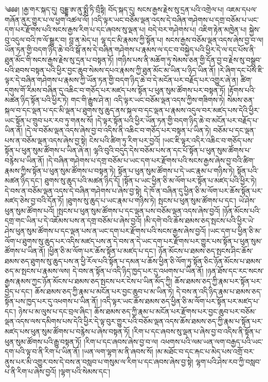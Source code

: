 \setcounter{footnote}{0} 
༄༅༅། །རྒྱ་གར་སྐད་དུ། བུདྡྷ་ཨ་ནུ་སྨྲྀ་ཏི་བྲྀཏྟི། བོད་སྐད་དུ། སངས་རྒྱས་རྗེས་སུ་དྲན་པའི་འགྲེལ་པ། འཇམ་དཔལ་གཞོན་ནུར་གྱུར་པ་ལ་ཕྱག་འཚལ་ལོ། །འདི་ལྟར་ཡང་བཅོམ་ལྡན་འདས་དེ་བཞིན་གཤེགས་པ་དགྲ་བཅོམ་པ་ཡང་དག་པར་རྫོགས་པའི་སངས་རྒྱས་རིག་པ་དང་ཞབས་སུ་ལྡན་པ། བདེ་བར་གཤེགས་པ། འཇིག་རྟེན་མཁྱེན་པ། སྐྱེས་བུ་འདུལ་བའི་ཁ་ལོ་སྒྱུར་བ། བླ་ན་མེད་པ། ལྷ་དང་མི་རྣམས་ཀྱི་སྟོན་པ། སངས་རྒྱས་བཅོམ་ལྡན་འདས་ཞེས་བྱ་བ་ལ། ཡོན་ཏན་གྱི་བདག་ཉིད་ཆེ་བའི་སྒོ་ནས་དེ་བཞིན་གཤེགས་པ་རྣམས་ལ་དང་བ་བསྐྱེད་པའི་ཕྱིར་དེ་ལ་དང་པོས་ནི་ཐུན་མོང་གི་སངས་རྒྱས་རྗེས་སུ་དྲན་པ་བསྟན་ཏོ། །གཉིས་པས་ནི་མཆོག་ཏུ་སེམས་ཅན་གྱི་དོན་བྱ་བ་རྗེས་སུ་བསྒྲུབ་པའི་ཐབས་བསྟན་པའི་ཕྱིར་བྱང་ཆུབ་སེམས་དཔའ་རྣམས་ཀྱི་ཐུན་མོང་མ་ཡིན་པ་ཉིད་ཡིན་ནོ། །རེ་ཞིག་དང་པོས་ཇི་ལྟར་དེ་བཞིན་གཤེགས་པ་རྣམས་ཀྱི་ཡོན་ཏན་གྱི་བདག་ཉིད་ཆེ་བ་དེ་མངོན་པར་བརྗོད་པར་འགྱུར་ཞེ་ན། ཚིག་དགུས་གོ་རིམས་བཞིན་དུ་འཆིང་བ་གཅོད་པར་མཛད་པས་སྟོན་པ་ཕུན་སུམ་ཚོགས་པར་བསྟན་ཏོ། །རྟོགས་པའི་མཚན་ཉིད་སྟོན་པའི་ཕྱིར་ཏེ། གང་གི་རྒྱུས་ཤེ་ན། འདི་ལྟར་ཡང་བཅོམ་ལྡན་འདས་ཀྱིས་གཟིགས་ཏེ། སེམས་ཅན་སྐལ་བ་དང་ལྡན་པ་དང་མི་ལྡན་པ་ཐུགས་སུ་ཆུད་ནས་སྐལ་བ་དང་ལྡན་པ་རྣམས་འདུལ་བར་མཛད་པས་དེའི་ཕྱིར་ཡང་སྟོན་པ་གྲུབ་པར་རབ་ཏུ་གནས་སོ། །དེ་ལྟར་སྟོན་པའི་ཕྱིར་ཡོན་ཏན་གྱི་བདག་ཉིད་ཆེ་བ་མངོན་པར་བརྗོད་པ་ཡིན་ནོ། །དེ་ལ་བཅོམ་ལྡན་འདས་ཞེས་བྱ་བ་འདིས་ནི་འཆིང་བ་གཅོད་པར་བསྟན་པ་ཡིན་ཏེ། བཅོམ་པ་དང་ལྡན་པས་ན་བཅོམ་ལྡན་འདས་ཞེས་བྱ་སྟེ། ངེས་པའི་ཚིག་ཏུ་རིག་པར་བྱའོ། །ཡང་ཇི་ལྟར་འདིར་འཆིང་བ་གཅོད་པས་སྟོན་པ་ཕུན་སུམ་ཚོགས་པ་ཡིན་ཞེ་ན། ལྷའི་བུའི་བདུད་དེས་བཅོམ་པས་ན་དང་པོ་སྟོན་པ་ཕུན་སུམ་ཚོགས་པ་བརྙེས་པ་ཡིན་ནོ། །དེ་བཞིན་གཤེགས་པ་དགྲ་བཅོམ་པ་ཡང་དག་པར་རྫོགས་པའི་སངས་རྒྱས་ཞེས་བྱ་བའི་ཚིག་རྣམས་ཀྱིས་སྟོན་པ་ཕུན་སུམ་ཚོགས་པ་བསྟན་ཏེ། སྟོན་པ་ཕུན་སུམ་ཚོགས་པ་དེ་ཡང་རྣམ་པ་གཉིས་ཏེ། སྟོན་པའི་མཚན་ཉིད་དང་། ཐུགས་སུ་ཆུད་པའི་མཚན་ཉིད་དོ། །སྟོན་པ་ཡང་ཕྱིན་ཅི་མ་ལོག་པར་སྟོན་པ་མཛད་པའི་ཕྱིར་ཏེ། དེ་བས་ན་བཅོམ་ལྡན་འདས་དེ་བཞིན་གཤེགས་པ་ཞེས་བྱ་སྟེ། དེ་ཁོ་ན་བཞིན་དུ་ཕྱིན་ཅི་མ་ལོག་པར་ཆོས་སྟོན་པར་མཛད་ཅེས་བྱ་བའི་དོན་ཏོ། །ཐུགས་སུ་ཆུད་པ་ཡང་རྣམ་པ་གཉིས་ཏེ། སྤངས་པ་ཕུན་སུམ་ཚོགས་པ་དང་། ཡེ་ཤེས་ཕུན་སུམ་ཚོགས་པའོ། །སྤངས་པ་ཕུན་སུམ་ཚོགས་པ་དང་ལྡན་པས་བཅོམ་ལྡན་འདས་ཞེས་བྱའོ། །ཉོན་མོངས་པའི་དགྲ་གང་ཡིན་པ་དེ་འཇོམས་པས་ན་དགྲ་བཅོམ་པ་ཞེས་བྱའོ། །མི་དགེ་བའི་ཆོས་ཐམས་ཅད་སྤངས་པའི་ཕྱིར་ཡེ་ཤེས་ཕུན་སུམ་ཚོགས་པ་དང་ལྡན་པས་ན་ཡང་དག་པར་རྫོགས་པའི་སངས་རྒྱས་ཞེས་བྱའོ། །ཡང་དག་པ་ཕྱིན་ཅི་མ་ལོག་པ་ཐུགས་སུ་ཆུད་པར་འདིས་མཛད་པས་ན་དེ་བས་ན་དེ་ཡང་དག་པར་རྫོགས་པར་གྱུར་པས་སྟོན་པ་ཕུན་སུམ་ཚོགས་པ་ཡིན་ནོ། །ཕྱིན་ཅི་མ་ལོག་པར་ཆོས་སྟོན་པ་མཛད་པ་དང་། ཉོན་མོངས་པ་ཐམས་ཅད་སྤངས་ཤིང་ཆོས་ཐམས་ཅད་ཐུགས་སུ་ཆུད་པས་ན་ཕྱི་རོལ་པའི་སྟོན་པ་དམན་པ་ཆོས་ཕྱིན་ཅི་ལོག་ཏུ་སྟོན་ཅིང་ཉོན་མོངས་པ་ཐམས་ཅད་མ་སྤངས་པ་རྣམས་ལས། དེ་བས་ན་སྟོན་པ་འདི་ཉིད་ཁྱད་པར་དུ་འཕགས་པ་ཡིན་ནོ། །ཉན་ཐོས་དང་རང་སངས་རྒྱས་རྣམས་ཀྱང་ཉོན་མོངས་པ་ཐམས་ཅད་སྤངས་པར་ངེས་པ་ཡིན་མོད་ཀྱི། ཆོས་ཐམས་ཅད་ཀྱི་རྣམ་པར་སྟོན་པར་བྱེད་པ་དང་། ཆོས་ཐམས་ཅད་ཀྱི་རྣམ་པ་མངོན་པར་བྱང་ཆུབ་པ་མ་ཡིན་ཏེ། དེ་བས་ན་འདི་ཉིད་རྣམ་པ་ཐམས་ཅད་སྟོན་པས་ཁྱད་པར་དུ་འཕགས་པ་ཡིན་ནོ། །འདི་ལྟར་ཡང་ཆོས་ཐམས་ཅད་ཕྱིན་ཅི་མ་ལོག་པར་སྟོན་པར་མཛད་པ་དང་། ཉེས་པ་མ་ལུས་པ་དང་བྲལ་ཞིང་། ཆོས་ཐམས་ཅད་ཀྱི་རྣམ་པ་མངོན་པར་རྫོགས་པར་བྱང་ཆུབ་པར་བཅོམ་ལྡན་འདས་ལས་དམིགས་པས་དེའི་ཕྱིར་དེ་ལྟ་བུར་གྱུར་པའི་བཅོམ་ལྡན་འདས་ཆོས་ཐམས་ཅད་ཀྱི་རྣམ་པ་སྟོན་པར་མཛད་པས་ཕུན་སུམ་ཚོགས་པ་བརྙེས་པ་ཞེས་བསྟན་ཏོ། །རིག་པ་དང་ཞབས་སུ་ལྡན་པ་ཞེས་བྱ་བ་འདིས་ནི་སྟོན་པ་ཕུན་སུམ་ཚོགས་པའི་རྒྱུ་བསྟན་ཏོ། །རིག་པ་དང་ཞབས་ཞེས་བྱ་བ་ལ། འཕགས་པའི་ལམ་ཡན་ལག་བརྒྱད་པའི་ཡང་དག་པའི་ལྟ་བ་ནི་རིག་པ་ཡིན་ནོ། །ཡན་ལག་ལྷག་མ་ནི་ཞབས་སོ། །མ་མཐོང་བ་དང་རྐང་པ་མེད་པས་འགྲོ་བར་ནུས་པར་མི་འགྱུར་བས་དེ་བས་ན་བསླབ་པ་གསུམ་ལ་རིག་པ་དང་ཞབས་ཞེས་བྱ་སྟེ། ལྷག་པའི་ཤེས་རབ་ཀྱི་བསླབ་པ་ནི་རིག་པ་ཞེས་བྱའོ། །ལྷག་པའི་སེམས་དང་། 